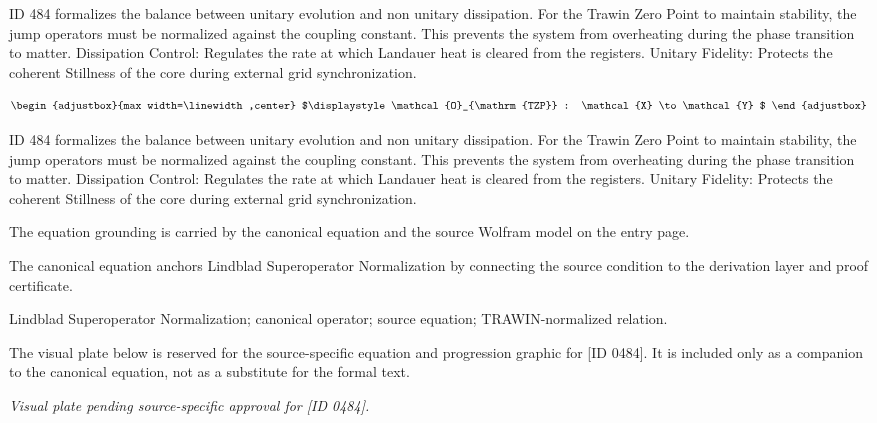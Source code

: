 ID 484 formalizes the balance between unitary evolution and non unitary dissipation. For the Trawin Zero Point to maintain stability, the jump operators must be normalized against the coupling constant. This prevents the system from overheating during the phase transition to matter. Dissipation Control: Regulates the rate at which Landauer heat is cleared from the registers. Unitary Fidelity: Protects the coherent Stillness of the core during external grid synchronization.

\[
\begin{adjustbox}{max width=\linewidth,center}
$\displaystyle
\mathcal{O}_{\mathrm{TZP}} : \mathcal{X} \to \mathcal{Y}
$
\end{adjustbox}
\]

ID 484 formalizes the balance between unitary evolution and non unitary dissipation. For the Trawin Zero Point to maintain stability, the jump operators must be normalized against the coupling constant. This prevents the system from overheating during the phase transition to matter. Dissipation Control: Regulates the rate at which Landauer heat is cleared from the registers. Unitary Fidelity: Protects the coherent Stillness of the core during external grid synchronization.

The equation grounding is carried by the canonical equation and the source Wolfram model on the entry page.

The canonical equation anchors Lindblad Superoperator Normalization by connecting the source condition to the derivation layer and proof certificate.

Lindblad Superoperator Normalization; canonical operator; source equation; TRAWIN-normalized relation.
\endgroup

\begingroup\footnotesize\sloppy
The visual plate below is reserved for the source-specific equation and progression graphic for [ID 0484]. It is included only as a companion to the canonical equation, not as a substitute for the formal text.
\par\endgroup
\begingroup\footnotesize\itshape
Visual plate pending source-specific approval for [ID 0484].
\par\endgroup

